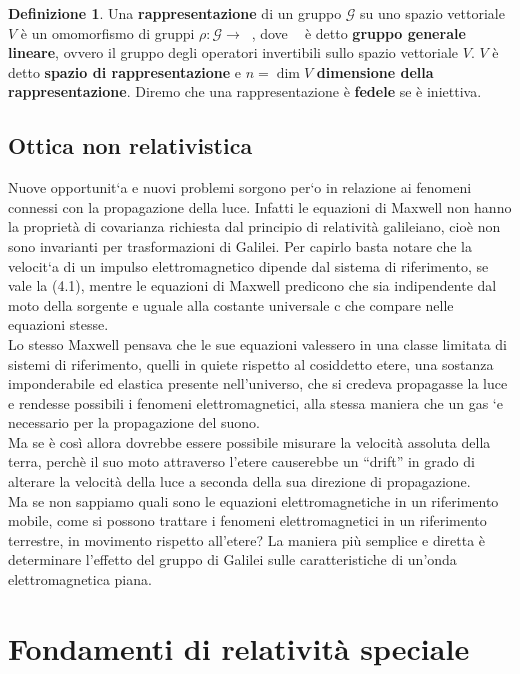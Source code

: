 \documentclass[a4paper,11pt]{book}
\theoremstyle{plain}
\theoremstyle{definition}
\newtheorem{defn}{Definizione}[chapter]
\DeclareMathOperator*{\gl}{GL(V)}
\begin{document}
\begin{defn}
Una \textbf{rappresentazione} di un gruppo $\mathcal{G}$ su uno spazio vettoriale $V$ è un omomorfismo di gruppi $\rho:\mathcal{G}\to\gl$, dove $\gl$ è detto \textbf{gruppo generale lineare}, ovvero il gruppo degli operatori invertibili sullo spazio vettoriale $V$. $V$ è detto \textbf{spazio di rappresentazione} e $n=\dim V$ \textbf{dimensione della rappresentazione}. Diremo che una rappresentazione è \textbf{fedele} se è iniettiva. 
\end{defn}

\section{Ottica non relativistica}
Nuove opportunit`a e nuovi problemi sorgono per`o in relazione ai fenomeni connessi con 
la propagazione della luce. Infatti le equazioni di Maxwell non hanno la proprietà di 
covarianza richiesta dal principio di relatività galileiano, cioè non sono invarianti per 
trasformazioni di Galilei. Per capirlo basta notare che la velocit`a di un impulso elettromagnetico dipende dal sistema di riferimento, se vale la (4.1), mentre le equazioni di 
Maxwell predicono che sia indipendente dal moto della sorgente e uguale alla costante 
universale c che compare nelle equazioni stesse. \\
Lo stesso Maxwell pensava che le sue equazioni valessero in una classe limitata di sistemi 
di riferimento, quelli in quiete rispetto al cosiddetto etere, una sostanza imponderabile 
ed elastica presente nell'universo, che si credeva propagasse la luce e rendesse possibili i 
fenomeni elettromagnetici, alla stessa maniera che un gas `e necessario per la propagazione 
del suono. \\
Ma se è così allora dovrebbe essere possibile misurare la velocità assoluta della terra, 
perchè il suo moto attraverso l'etere causerebbe un “drift” in grado di alterare la velocità 
della luce a seconda della sua direzione di propagazione. \\
Ma se non sappiamo quali sono le equazioni elettromagnetiche in un riferimento mobile, 
come si possono trattare i fenomeni elettromagnetici in un riferimento terrestre, in movimento rispetto all'etere? La maniera più semplice e diretta è determinare l'effetto del 
gruppo di Galilei sulle caratteristiche di un'onda elettromagnetica piana. 

\newpage

\chapter{Fondamenti di relatività speciale}
\end{document}
